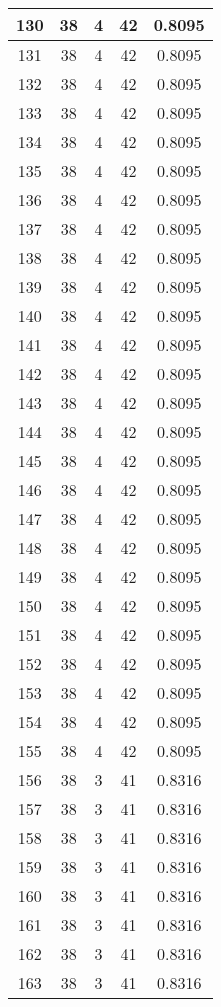 \documentclass[letterpaper, 12pt]{article}
\begin{document}
\begin{longtable}{|c|c|c|c|c|}
\hline
130 & 38 & 4 & 42 & 0.8095 \\
\hline
131 & 38 & 4 & 42 & 0.8095 \\
\hline
132 & 38 & 4 & 42 & 0.8095 \\
\hline
133 & 38 & 4 & 42 & 0.8095 \\
\hline
134 & 38 & 4 & 42 & 0.8095 \\
\hline
135 & 38 & 4 & 42 & 0.8095 \\
\hline
136 & 38 & 4 & 42 & 0.8095 \\
\hline
137 & 38 & 4 & 42 & 0.8095 \\
\hline
138 & 38 & 4 & 42 & 0.8095 \\
\hline
139 & 38 & 4 & 42 & 0.8095 \\
\hline
140 & 38 & 4 & 42 & 0.8095 \\
\hline
141 & 38 & 4 & 42 & 0.8095 \\
\hline
142 & 38 & 4 & 42 & 0.8095 \\
\hline
143 & 38 & 4 & 42 & 0.8095 \\
\hline
144 & 38 & 4 & 42 & 0.8095 \\
\hline
145 & 38 & 4 & 42 & 0.8095 \\
\hline
146 & 38 & 4 & 42 & 0.8095 \\
\hline
147 & 38 & 4 & 42 & 0.8095 \\
\hline
148 & 38 & 4 & 42 & 0.8095 \\
\hline
149 & 38 & 4 & 42 & 0.8095 \\
\hline
150 & 38 & 4 & 42 & 0.8095 \\
\hline
151 & 38 & 4 & 42 & 0.8095 \\
\hline
152 & 38 & 4 & 42 & 0.8095 \\
\hline
153 & 38 & 4 & 42 & 0.8095 \\
\hline
154 & 38 & 4 & 42 & 0.8095 \\
\hline
155 & 38 & 4 & 42 & 0.8095 \\
\hline
156 & 38 & 3 & 41 & 0.8316 \\
\hline
157 & 38 & 3 & 41 & 0.8316 \\
\hline
158 & 38 & 3 & 41 & 0.8316 \\
\hline
159 & 38 & 3 & 41 & 0.8316 \\
\hline
160 & 38 & 3 & 41 & 0.8316 \\
\hline
161 & 38 & 3 & 41 & 0.8316 \\
\hline
162 & 38 & 3 & 41 & 0.8316 \\
\hline
163 & 38 & 3 & 41 & 0.8316 \\

\end{longtable}
\end{document}
